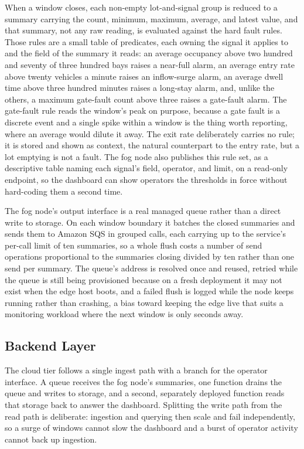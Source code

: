 \documentclass[conference]{IEEEtran}
\begin{document}
When a window closes, each non-empty lot-and-signal group is reduced to a summary carrying the count, minimum, maximum, average, and latest value, and that summary, not any raw reading, is evaluated against the hard fault rules. Those rules are a small table of predicates, each owning the signal it applies to and the field of the summary it reads: an average occupancy above two hundred and seventy of three hundred bays raises a near-full alarm, an average entry rate above twenty vehicles a minute raises an inflow-surge alarm, an average dwell time above three hundred minutes raises a long-stay alarm, and, unlike the others, a maximum gate-fault count above three raises a gate-fault alarm. The gate-fault rule reads the window's peak on purpose, because a gate fault is a discrete event and a single spike within a window is the thing worth reporting, where an average would dilute it away. The exit rate deliberately carries no rule; it is stored and shown as context, the natural counterpart to the entry rate, but a lot emptying is not a fault. The fog node also publishes this rule set, as a descriptive table naming each signal's field, operator, and limit, on a read-only endpoint, so the dashboard can show operators the thresholds in force without hard-coding them a second time.

The fog node's output interface is a real managed queue rather than a direct write to storage. On each window boundary it batches the closed summaries and sends them to Amazon SQS in grouped calls, each carrying up to the service's per-call limit of ten summaries, so a whole flush costs a number of send operations proportional to the summaries closing divided by ten rather than one send per summary. The queue's address is resolved once and reused, retried while the queue is still being provisioned because on a fresh deployment it may not exist when the edge host boots, and a failed flush is logged while the node keeps running rather than crashing, a bias toward keeping the edge live that suits a monitoring workload where the next window is only seconds away.

\subsection{Backend Layer}

The cloud tier follows a single ingest path with a branch for the operator interface. A queue receives the fog node's summaries, one function drains the queue and writes to storage, and a second, separately deployed function reads that storage back to answer the dashboard. Splitting the write path from the read path is deliberate: ingestion and querying then scale and fail independently, so a surge of windows cannot slow the dashboard and a burst of operator activity cannot back up ingestion.
\end{document}
